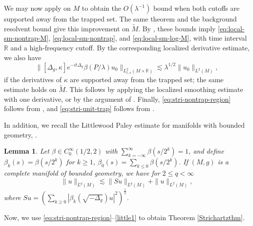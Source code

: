 \documentclass[11pt]{amsart}
\newcommand{\la}{\lambda}
\newtheorem{lemma}{Lemma}[section]
\begin{document}
We may now apply \cite[Theorem 1.2]{nontrappinglocalsmoothing} on $M$ to obtain the $O(\la^{-1})$ bound when both cutoffs are supported away from the trapped set. The same theorem and the background resolvent bound give this improvement on $\tilde M$. By \cite[Theorem 7.2 and Interpretation 2]{spectralbookdyatlov}, these bounds imply \eqref{eq:local-sm-nontrap-M}, \eqref{eq:local-sm-nontrap}, and \eqref{eq:local-sm-log-M}, with time interval $\mathbb R$ and a high-frequency cutoff. By the corresponding localized derivative estimate, we also have
\begin{equation}\label{eq:comm-sm}
\|[\Delta_g,\kappa]e^{-it\Delta_g}\beta(P/\la)u_0\|_{L^2_{t,x}(M\times\mathbb R)}
\lesssim \la^{1/2}\|u_0\|_{L^2(M)},
\end{equation}
if the derivatives of $\kappa$ are supported away from the trapped set; the same estimate holds on $\tilde M$. This follows by applying the localized smoothing estimate with one derivative, or by the argument of \cite[Lemma 2.6]{HSTZ}.
Finally, \eqref{eq:stri-nontrap-region} follows from \cite[Theorem 3.6]{BGH}, and \eqref{eq:stri-unit-trap} follows from \cite[Theorem 1.1]{HSTZ}.

In addition, we recall the Littlewood Paley estimate for manifolds with bounded geometry, \cite[Lemma 4.1]{HSTZ}.
\begin{lemma}\label{littlewood}
    Let 
    $\beta\in C_0^\infty (1/2, 2)$ with $\sum_{k=-\infty}^\infty \beta(s/2^k)=1$, and define $\beta_k(s)=\beta(s/2^k)$ for $k\geq1$, $\beta_0(s)= \sum_{k\le 0} \beta(s/2^k)$. If $(M,g)$ is a complete manifold of bounded geometry, we have for  $2\le q<\infty$
    \begin{equation}\label{little1}
        \|u\|_{L^q(M)}\lesssim \|Su\|_{L^q(M)} +\|u\|_{L^2(M)},
    \end{equation}
    where $Su=\left(\sum_{k\ge0} |\beta_k(\sqrt{-\Delta_g})u|^2\right)^{\frac12}$.
\end{lemma}
Now, we use \eqref{eq:stri-nontrap-region}--\eqref{little1} to obtain Theorem \ref{Strichartzthm}.
\end{document}

